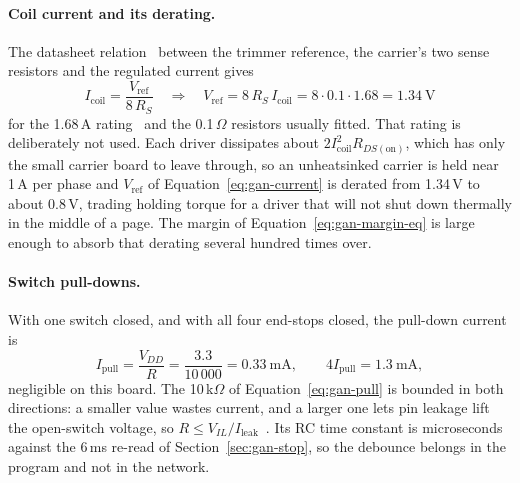 \paragraph{Coil current and its derating.}
The datasheet relation~\cite[p.~9]{a4988ds} between the trimmer reference, the carrier's two sense resistors and the regulated current gives
\begin{equation}
I_{\mathrm{coil}}=\frac{V_{\mathrm{ref}}}{8\,R_S}\quad\Longrightarrow\quad V_{\mathrm{ref}}=8\,R_S\,I_{\mathrm{coil}}=8\cdot0.1\cdot1.68=1.34\ \mathrm{V}
\label{eq:gan-current}
\end{equation}
for the 1.68\,A rating~\cite{stepperds} and the 0.1\,$\Omega$ resistors usually fitted. That rating is deliberately not used. Each driver dissipates about $2I_{\mathrm{coil}}^2R_{DS(\mathrm{on})}$, which has only the small carrier board to leave through, so an unheatsinked carrier is held near 1\,A per phase and $V_{\mathrm{ref}}$ of Equation~\ref{eq:gan-current} is derated from 1.34\,V to about 0.8\,V, trading holding torque for a driver that will not shut down thermally in the middle of a page. The margin of Equation~\ref{eq:gan-margin-eq} is large enough to absorb that derating several hundred times over.

\paragraph{Switch pull-downs.}
With one switch closed, and with all four end-stops closed, the pull-down current is
\begin{equation}
I_{\mathrm{pull}}=\frac{V_{DD}}{R}=\frac{3.3}{10\,000}=0.33\ \mathrm{mA},\qquad 4I_{\mathrm{pull}}=1.3\ \mathrm{mA},
\label{eq:gan-pull}
\end{equation}
negligible on this board. The 10\,k$\Omega$ of Equation~\ref{eq:gan-pull} is bounded in both directions: a smaller value wastes current, and a larger one lets pin leakage lift the open-switch voltage, so $R\le V_{IL}/I_{\mathrm{leak}}$~\cite{odroidn2ds}. Its RC time constant is microseconds against the 6\,ms re-read of Section~\ref{sec:gan-stop}, so the debounce belongs in the program and not in the network.

